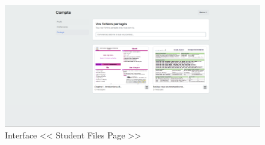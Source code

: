 \begin{figure}[H]
    \centering
    \includegraphics[width=1.1\textwidth,height=0.5\textwidth]{images/chp5/fig22.png}
    \caption{Interface << Student Files Page >>}
    \label{Interface << Student Files Page >>}    
\end{figure}

